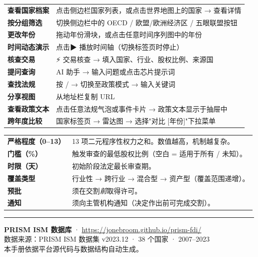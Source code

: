 \documentclass[12pt,a4paper]{article}
\begin{document}
\begin{tcolorbox}[enhanced, colback=lightgray, colframe=midgray, arc=6pt, title={\textbf{PRISM 功能速查}}, fonttitle=\bfseries]
\small
\begin{tabular}{@{}p{4.5cm}p{9cm}@{}}
\textbf{查看国家档案} & 点击侧边栏国家列表，或点击世界地图上的国家 → 查看详情 \\[3pt]
\textbf{按分组筛选} & 切换侧边栏中的 OECD / 欧盟/欧洲经济区 / 五眼联盟按钮 \\[3pt]
\textbf{更改年份} & 拖动年份滑块，或点击任意时间序列图中的年份 \\[3pt]
\textbf{时间动态演示} & 点击▶ 播放时间轴（切换标签页时停止） \\[3pt]
\textbf{核查交易} & ⚡ 交易核查 → 填入国家、行业、股权比例、来源国 \\[3pt]
\textbf{提问查询} & AI 助手 → 输入问题或点击芯片提示词 \\[3pt]
\textbf{查找法规} & 按 / → 切换至政策模式 → 输入关键词 \\[3pt]
\textbf{分享视图} & 从地址栏复制 URL \\[3pt]
\textbf{查看政策文本} & 点击任意法规气泡或事件卡片 → 政策文本显示于抽屉中 \\[3pt]
\textbf{跨年度比较} & 国家标签页 → 雷达图 → 选择"对比 [年份]"下拉菜单 \\[3pt]
\end{tabular}
\end{tcolorbox}

\vspace{1em}
\begin{tcolorbox}[enhanced, colback=prismclay!6, colframe=prismclay!40, arc=6pt, title={\textbf{数据字段速查}}, fonttitle=\bfseries]
\small
\begin{tabular}{@{}p{4cm}p{9.5cm}@{}}
\textbf{严格程度（0--13）} & 13 项二元程序性权力之和。数值越高，机制越复杂。 \\[3pt]
\textbf{门槛（\%）} & 触发审查的最低股权比例（空白 = 适用于所有 / 未知）。 \\[3pt]
\textbf{时限（天）} & 初始阶段法定最长审查期。 \\[3pt]
\textbf{覆盖类型} & 行业性 → 跨行业 → 混合型 → 资产型（覆盖范围递增）。 \\[3pt]
\textbf{预批} & 须在交割\textit{前}取得许可。 \\[3pt]
\textbf{通知} & 须向主管机构通知（决定作出前可完成交割）。 \\[3pt]
\end{tabular}
\end{tcolorbox}

\vspace{2em}
\hrule
\vspace{0.5em}
{\small\color{gray}
\textbf{PRISM ISM 数据库} · \url{https://jonebroom.github.io/prism-fdi/}\\
数据来源：PRISM ISM 数据集 v2023.12 · 38 个国家 · 2007--2023\\
本手册依据平台源代码与数据结构自动生成。
}
\end{document}
